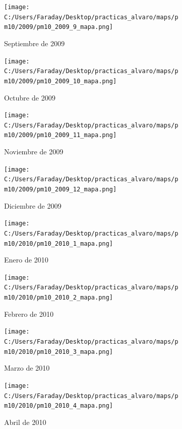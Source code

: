 \documentclass[12pt]{article}
\begin{document}
\begin{figure}[H]
\centering
\begin{subfigure}[h]{0.45\textwidth}
\texttt{[image: C:/Users/Faraday/Desktop/practicas\_alvaro/maps/pm10/2009/pm10\_2009\_9\_mapa.png]}
\caption{Septiembre de 2009}
\label{fig:map-mon-3-9-2009}
\end{subfigure}
%
\begin{subfigure}[H]{0.45\textwidth}
\texttt{[image: C:/Users/Faraday/Desktop/practicas\_alvaro/maps/pm10/2009/pm10\_2009\_10\_mapa.png]}
\caption{Octubre de 2009}
\label{fig:map-mon-3-10-2009}
\end{subfigure}
\caption{}
\end{figure}

\begin{figure}[H]
\centering
\begin{subfigure}[h]{0.45\textwidth}
\texttt{[image: C:/Users/Faraday/Desktop/practicas\_alvaro/maps/pm10/2009/pm10\_2009\_11\_mapa.png]}
\caption{Noviembre de 2009}
\label{fig:map-mon-3-11-2009}
\end{subfigure}
%
\begin{subfigure}[H]{0.45\textwidth}
\texttt{[image: C:/Users/Faraday/Desktop/practicas\_alvaro/maps/pm10/2009/pm10\_2009\_12\_mapa.png]}
\caption{Diciembre de 2009}
\label{fig:map-mon-3-12-2009}
\end{subfigure}
\caption{}
\end{figure}

\newpage

\begin{figure}[H]
\centering
\begin{subfigure}[h]{0.45\textwidth}
\texttt{[image: C:/Users/Faraday/Desktop/practicas\_alvaro/maps/pm10/2010/pm10\_2010\_1\_mapa.png]}
\caption{Enero de 2010}
\label{fig:map-mon-3-1-2010}
\end{subfigure}
%
\begin{subfigure}[H]{0.45\textwidth}
\texttt{[image: C:/Users/Faraday/Desktop/practicas\_alvaro/maps/pm10/2010/pm10\_2010\_2\_mapa.png]}
\caption{Febrero de 2010}
\label{fig:map-mon-3-2-2010}
\end{subfigure}
\caption{}
\end{figure}

\begin{figure}[H]
\centering
\begin{subfigure}[h]{0.45\textwidth}
\texttt{[image: C:/Users/Faraday/Desktop/practicas\_alvaro/maps/pm10/2010/pm10\_2010\_3\_mapa.png]}
\caption{Marzo de 2010}
\label{fig:map-mon-3-3-2010}
\end{subfigure}
%
\begin{subfigure}[H]{0.45\textwidth}
\texttt{[image: C:/Users/Faraday/Desktop/practicas\_alvaro/maps/pm10/2010/pm10\_2010\_4\_mapa.png]}
\caption{Abril de 2010}
\label{fig:map-mon-3-4-2010}
\end{subfigure}
\caption{}
\end{figure}
\end{document}
